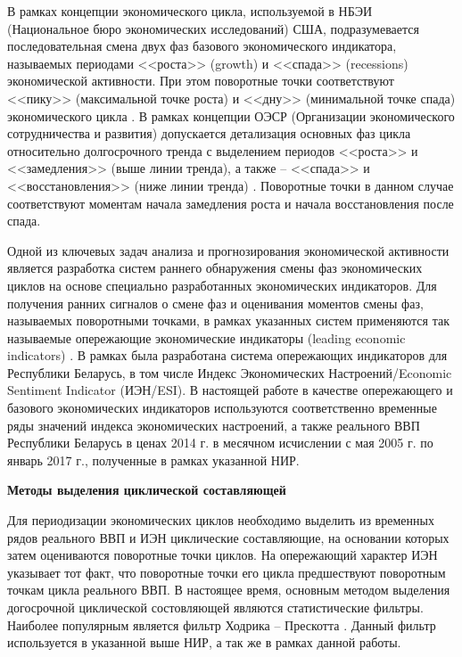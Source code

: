 \documentclass[a4paper,14pt]{extreport}
\begin{document}
	В рамках концепции экономического цикла, используемой в НБЭИ (Национальное бюро экономических исследований) США, подразумевается последовательная смена двух фаз базового экономического индикатора, называемых периодами <<роста>> (growth)  и <<спада>> (recessions) экономической активности. При этом поворотные точки соответствуют <<пику>> (максимальной точке роста) и <<дну>> (минимальной точке спада) экономического цикла \cite{nberDevelopment}.  В рамках концепции ОЭСР (Организации экономического сотрудничества и развития) допускается  детализация основных фаз цикла относительно долгосрочного тренда с выделением периодов <<роста>> и <<замедления>> (выше линии тренда), а также  -- <<спада>> и <<восстановления>>  (ниже линии тренда) \cite{oecdCycleExtraction}. Поворотные точки в данном случае соответствуют моментам начала замедления роста и начала восстановления после спада. 
	
	Одной из ключевых задач анализа и прогнозирования экономической активности является разработка систем раннего обнаружения смены фаз экономических циклов на основе специально разработанных экономических индикаторов. Для получения ранних сигналов о смене фаз и оценивания моментов смены фаз, называемых поворотными точками, в рамках указанных систем применяются так называемые опережающие экономические индикаторы (leading economic indicators) \cite{oecdCLI}. В рамках \cite{esiMaking,esiMakingAlt,esiExtra} была разработана система опережающих индикаторов для Республики Беларусь, в том числе Индекс Экономических Настроений/Economic Sentiment Indicator (ИЭН/ESI). В настоящей работе в качестве опережающего и базового экономических индикаторов используются соответственно временные ряды значений индекса экономических настроений, а также реального ВВП Республики Беларусь в ценах 2014 г. в месячном исчислении с мая 2005 г. по январь 2017 г., полученные в рамках указанной НИР.
	
	\bigskip
	\textbf{Методы выделения циклической составляющей}
	
	Для периодизации экономических циклов необходимо выделить из временных рядов реального ВВП и ИЭН циклические составляющие, на основании которых затем оцениваются поворотные точки циклов. На опережающий характер ИЭН указывает тот факт, что поворотные точки его цикла предшествуют поворотным точкам цикла реального ВВП. В настоящее время, основным методом выделения догосрочной циклической состовляющей являются статистические фильтры. Наиболее популярным является фильтр Ходрика -- Прескотта \cite{oecdCycleExtraction,estrellaFilterDo}. Данный фильтр используется в указанной выше НИР, а так же в рамках данной работы. 
	
\end{document}
